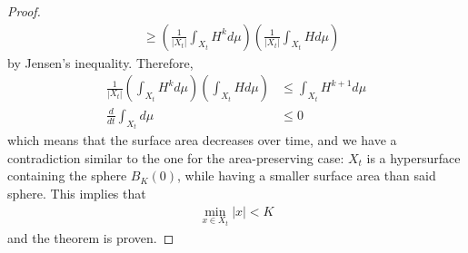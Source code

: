 \begin{proof}
\begin{align*}
		&\geq \left(\frac{1}{|X_t|}\int_{X_t}  H^{k} d\mu\right) \left(\frac{1}{|X_t|}\int_{X_t}  H d\mu\right)
	\end{align*}
	by Jensen's inequality. Therefore, 
	\begin{align*}
		\frac{1}{|X_t|} \left(\int_{X_t}  H^{k} d\mu\right) \left(\int_{X_t}  H d\mu\right)&\leq \int_{X_t}  H^{k+1} d\mu\\
		\frac{d}{d t}\int_{X_t} d\mu &\leq 0
	\end{align*}
	which means that the surface area decreases over time, and we have a contradiction similar to the one for the area-preserving case: $X_t$ is a hypersurface containing the sphere $B_K(0)$, while having a smaller surface area than said sphere. This implies that 
	\begin{align*}
		\min_{x\in X_t} |x| < K
	\end{align*}
	and the theorem is proven. 
\end{proof}



